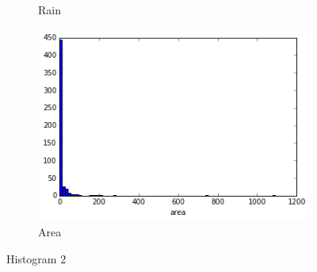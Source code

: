 \begin{figure}[!ht]
\begin{subfigure}[b]{.45\linewidth}
\caption{Rain}\label{fig:tiger}
\end{subfigure}
\begin{subfigure}[b]{.45\linewidth}
\includegraphics[width=\linewidth]{fig/hist/area.png}
\caption{Area}\label{fig:tiger}
\end{subfigure}
\caption{Histogram 2}
\end{figure}
